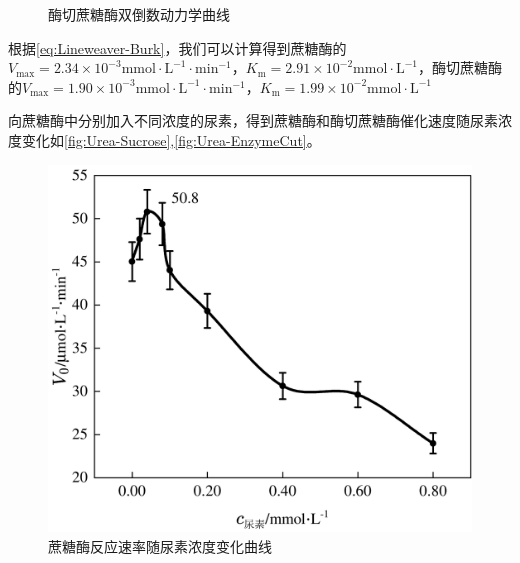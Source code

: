 \begin{figure}[H]
\begin{minipage}[t]{0.49\textwidth}
        \caption{酶切蔗糖酶双倒数动力学曲线}
        \label{fig:Kinetics-EnzymeCut}
    \end{minipage}
\end{figure}

根据\autoref{eq:Lineweaver-Burk}，我们可以计算得到蔗糖酶的$V_\mathrm{max} = 2.34\times 10^{-3} \mathrm{mmol\cdot L^{-1} \cdot min^{-1}}$，$K_\mathrm{m}=2.91\times 10^{-2} \mathrm{mmol\cdot L^{-1}}$，酶切蔗糖酶的$V_\mathrm{max} = 1.90\times 10^{-3} \mathrm{mmol\cdot L^{-1} \cdot min^{-1}}$，$K_\mathrm{m}=1.99\times 10^{-2} \mathrm{mmol\cdot L^{-1}}$

向蔗糖酶中分别加入不同浓度的尿素，得到蔗糖酶和酶切蔗糖酶催化速度随尿素浓度变化如\autoref{fig:Urea-Sucrose},\autoref{fig:Urea-EnzymeCut}。

\newpage
\begin{figure}[H]
    \begin{minipage}[t]{0.49\textwidth}
        \includegraphics[width = \textwidth]{figure/1215/Urea-Sucrose.pdf}
        \caption{蔗糖酶反应速率随尿素浓度变化曲线}
        \label{fig:Urea-Sucrose}
    \end{minipage}
    \begin{minipage}[t]{0.49\textwidth}

\end{minipage}
\end{figure}
